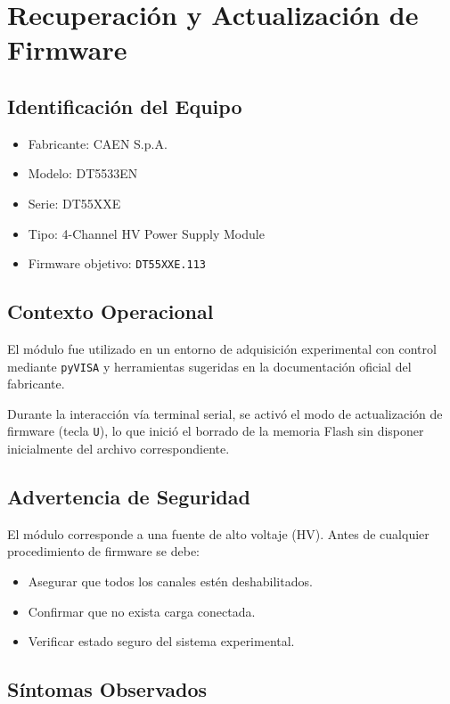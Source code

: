 \documentclass{article}
\begin{document}
\section{Recuperación y Actualización de Firmware}
\label{sec:fw_update_dt5533en}

\subsection{Identificación del Equipo}

\begin{itemize}
    \item Fabricante: CAEN S.p.A.
    \item Modelo: DT5533EN
    \item Serie: DT55XXE
    \item Tipo: 4-Channel HV Power Supply Module
    \item Firmware objetivo: \texttt{DT55XXE.113}
\end{itemize}

\subsection{Contexto Operacional}

El módulo fue utilizado en un entorno de adquisición experimental
con control mediante \texttt{pyVISA} y herramientas sugeridas en la documentación
oficial del fabricante.

Durante la interacción vía terminal serial, se activó el modo
de actualización de firmware (tecla \texttt{U}),
lo que inició el borrado de la memoria Flash
sin disponer inicialmente del archivo correspondiente.

\subsection{Advertencia de Seguridad}

El módulo corresponde a una fuente de alto voltaje (HV).
Antes de cualquier procedimiento de firmware se debe:

\begin{itemize}
    \item Asegurar que todos los canales estén deshabilitados.
    \item Confirmar que no exista carga conectada.
    \item Verificar estado seguro del sistema experimental.
\end{itemize}


\subsection{Síntomas Observados}
\end{document}
